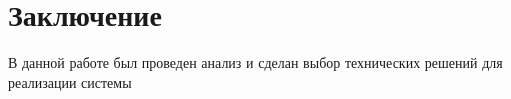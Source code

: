 \section{\Large{Заключение}}
В данной работе был проведен анализ и сделан выбор технических решений для реализации системы
